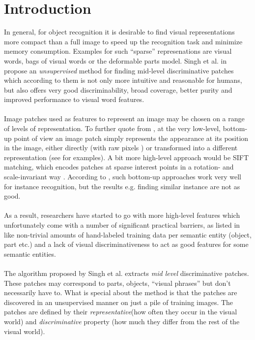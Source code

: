 \section{Introduction}

In general, for object recognition it is desirable to find visual representations more compact than a full image to 
speed up the recognition task and minimize memory consumption. Examples for such ``sparse'' represenations are visual words,
bags of visual words or the deformable parts model. Singh et al. in \cite{Singh2012DiscPat} propose an \textit{unsupervised} method for finding mid-level
discriminative patches which according to them is not only more intuitive and reasonable for humans, but also offers very good discriminability,
broad coverage, better purity and improved performance to visual word features.\\
\\
Image patches used as features to represent an image may be chosen on a range of levels of representation.
To further quote from \cite{Singh2012DiscPat}, at the very low-level, bottom-up point of view an image patch simply represents
the appearance at its position in the image, either directly (with raw pixels \cite{Ulman2002VisualFeatures}) or transformed into a different representation (see \cite{Singh2012DiscPat} for examples).
A bit more high-level approach would be SIFT matching, which encodes patches at sparse interest points in a rotation- and scale-invariant 
way \cite{Lowe2004SIFT}. According to \cite{Singh2012DiscPat}, such bottom-up approaches work very well for instance recognition, but the results 
e.g. finding similar instance are not as good.\\
\\
As a result, researchers have started to go with more high-level features which unfortunately come with a number of significant practical barriers,
as listed in \cite{Singh2012DiscPat} like non-trivial amounts of hand-labeled training data per semantic entity (object, part etc.) and a lack
of visual discriminativeness to act as good features for some semantic entities.\\
\\
The algorithm proposed by Singh et al. extracts \textit{mid level} discriminative patches. These patches may correspond to parts, objects, ``visual phrases''
but don't necessarily have to. What is special about the method is that the patches are discovered in an unsupervised manner on just a pile of training images.
The patches are defined by their \textit{representative}(how often they occur in the visual world) and \textit{discriminative} property (how much they differ from the rest of the visual world).

